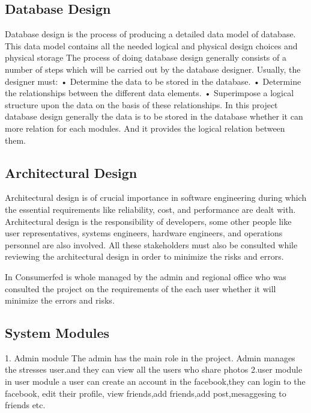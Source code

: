 \documentclass[a4paper,12pt]{article}
\begin{document}
\subsection{Database Design}
\hspace{5mm}
   Database design is the process of producing a detailed data model of database. This data model contains all the needed logical and physical design choices and physical storage The process of doing database design generally consists of a number of steps which will be carried out by the database designer. Usually, the designer must:
•	Determine the data to be stored in the database.
•	Determine the relationships between the different data elements.
•	Superimpose a logical structure upon the data on the basis of these relationships.
In this project database design generally the data is to be stored in the database whether it can more relation for each modules. And it provides the logical relation between them.
 \newpage
\subsection{Architectural Design}  
\hspace{5mm}
Architectural design is of crucial importance in software engineering during which the essential requirements like reliability, cost, and performance are dealt with. Architectural design is the responsibility of developers, some other people like user representatives, systems engineers, hardware engineers, and operations personnel are also involved. All these stakeholders must also be consulted while reviewing the architectural design in order to minimize the risks and errors.
\vspace{5mm}\newline\par
In Consumerfed is whole managed by the admin and regional office who was consulted the project on the requirements of the each user whether it will minimize the errors and risks.
\newpage
\subsection{System Modules}  
\hspace{5mm}
1. Admin module
The admin has the main role in the project. Admin manages the stresses user.and they can view all the users who share photos
\vspace{5mm}\newline
2.user module
in user module a user can create an account in the facebook,they can login to the facebook, edit their profile, view friends,add friends,add post,mesaggesing to friends etc.
\newpage
\end{document}
